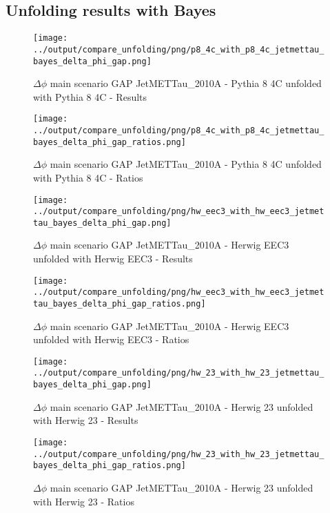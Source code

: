 \documentclass[11pt]{book}
\begin{document}
\subsection{Unfolding results with Bayes}

\begin{figure}[ht]
\centering
\texttt{[image: ../output/compare\_unfolding/png/p8\_4c\_with\_p8\_4c\_jetmettau\_bayes\_delta\_phi\_gap.png]}
\caption{$\Delta\phi$ main scenario GAP JetMETTau\_2010A - Pythia 8 4C unfolded with Pythia 8 4C - Results}
\label{p8_p8_jetmettau_bayes_delta_phi_gap_a}
\end{figure}

\begin{figure}[ht]
\centering
\texttt{[image: ../output/compare\_unfolding/png/p8\_4c\_with\_p8\_4c\_jetmettau\_bayes\_delta\_phi\_gap\_ratios.png]}
\caption{$\Delta\phi$ main scenario GAP JetMETTau\_2010A - Pythia 8 4C unfolded with Pythia 8 4C - Ratios}
\label{p8_p8_jetmettau_bayes_delta_phi_gap_b}
\end{figure}

\begin{figure}[ht]
\centering
\texttt{[image: ../output/compare\_unfolding/png/hw\_eec3\_with\_hw\_eec3\_jetmettau\_bayes\_delta\_phi\_gap.png]}
\caption{$\Delta\phi$ main scenario GAP JetMETTau\_2010A - Herwig EEC3 unfolded with Herwig EEC3 - Results}
\label{hw_eec3_hw_eec3_jetmettau_bayes_delta_phi_gap_a}
\end{figure}

\begin{figure}[ht]
\centering
\texttt{[image: ../output/compare\_unfolding/png/hw\_eec3\_with\_hw\_eec3\_jetmettau\_bayes\_delta\_phi\_gap\_ratios.png]}
\caption{$\Delta\phi$ main scenario GAP JetMETTau\_2010A - Herwig EEC3 unfolded with Herwig EEC3 - Ratios}
\label{hw_eec3_hw_eec3_jetmettau_bayes_delta_phi_gap_b}
\end{figure}

\begin{figure}[ht]
\centering
\texttt{[image: ../output/compare\_unfolding/png/hw\_23\_with\_hw\_23\_jetmettau\_bayes\_delta\_phi\_gap.png]}
\caption{$\Delta\phi$ main scenario GAP JetMETTau\_2010A - Herwig 23 unfolded with Herwig 23 - Results}
\label{hw_23_hw_23_jetmettau_bayes_delta_phi_gap_a}
\end{figure}

\begin{figure}[ht]
\centering
\texttt{[image: ../output/compare\_unfolding/png/hw\_23\_with\_hw\_23\_jetmettau\_bayes\_delta\_phi\_gap\_ratios.png]}
\caption{$\Delta\phi$ main scenario GAP JetMETTau\_2010A - Herwig 23 unfolded with Herwig 23 - Ratios}
\label{hw_23_hw_23_jetmettau_bayes_delta_phi_gap_b}
\end{figure}
\end{document}
